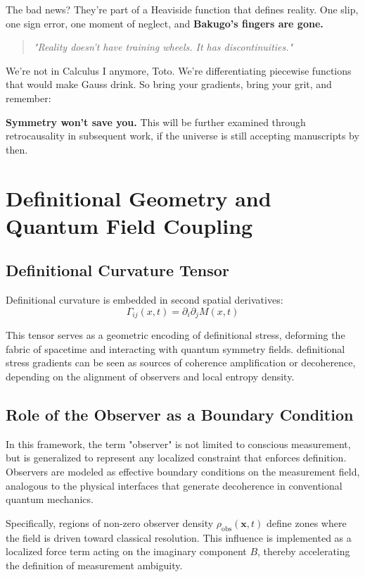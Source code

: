 The bad news? They're part of a Heaviside function that defines reality. One slip, one sign error, one moment of neglect, and \textbf{Bakugo's fingers are gone.}

\begin{quote}
\emph{"Reality doesn't have training wheels. It has discontinuities."}
\end{quote}

We're not in Calculus I anymore, Toto. We're differentiating piecewise functions that would make Gauss drink. So bring your gradients, bring your grit, and remember:

\textbf{Symmetry won't save you.} This will be further examined through retrocausality in subsequent work, if the universe is still accepting manuscripts by then.


\section{Definitional Geometry and Quantum Field Coupling}

\subsection{Definitional Curvature Tensor}

Definitional curvature is embedded in second spatial derivatives:
\begin{equation}
\Gamma_{ij}(x,t) = \partial_i \partial_j M(x,t)
\end{equation}

This tensor serves as a geometric encoding of definitional stress, deforming the fabric of spacetime and interacting with quantum symmetry fields. definitional stress gradients can be seen as sources of coherence amplification or decoherence, depending on the alignment of observers and local entropy density.

\subsection*{Role of the Observer as a Boundary Condition}

In this framework, the term "observer" is not limited to conscious measurement, but is generalized to represent any localized constraint that enforces definition. Observers are modeled as effective boundary conditions on the measurement field, analogous to the physical interfaces that generate decoherence in conventional quantum mechanics.

Specifically, regions of non-zero observer density \(\rho_{\text{obs}}(\mathbf{x}, t)\) define zones where the field is driven toward classical resolution. This influence is implemented as a localized force term acting on the imaginary component \(B\), thereby accelerating the definition of measurement ambiguity.

